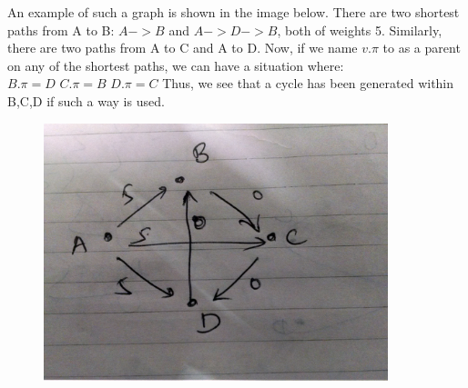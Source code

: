 \documentclass[10pt]{article}
\begin{document}
An example of such a graph is shown in the image below. There are two shortest paths from A to B: $A->B$ and $A->D->B$, both of weights 5. Similarly, there are two paths from A to C and A to D. Now, if we name $v.\pi$ to as a parent on any of the shortest paths, we can have a situation where:\\
$B.\pi = D$
$C.\pi = B$
$D.\pi = C$
Thus, we see that a cycle has been generated within B,C,D if such a way is used.
\newpage
\begin{figure}[ht!]
\includegraphics[width=100mm]{IMG_2511.JPG}\\
\end{figure}
\newpage
\end{document}
